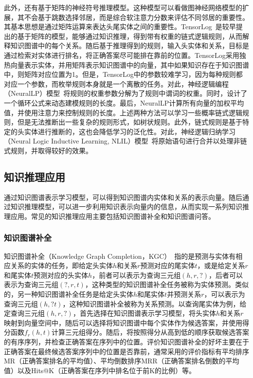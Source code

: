 \documentclass[algorithmlist, AutoFakeBold, AutoFakeSlant, figurelist, tablelist, nomlist, engineering]{seuthesix}
\begin{document}
此外，还有基于矩阵的神经符号推理模型。这种模型可以看做图神经网络模型的扩展，其不会基于跳数选择邻居，而是综合软注意力分数来评估不同邻居的重要性。其基本思想是通过矩阵运算来表达头尾实体之间的重要性。TensorLog~\cite{cohen2016tensorlog}是较早提出的基于矩阵的模型，能够通过知识推理，得到带有权重的链式逻辑规则，从而解释知识图谱中的每个关系。随后基于推理得到的规则，输入头实体和关系，目标是通过检索对实体进行排名，将正确答案尽可能排在靠前的位置。TensorLog采用独热向量表示实体，并用矩阵表示知识图谱中的向量，其中如果知识存在于知识图谱中，则矩阵对应位置为1。但是，TensorLog中的参数较难学习，因为每种规则都对应一个参数，而枚举规则本身就是一个离散的任务。对此，神经逻辑编程（NeuralLP）模型~\cite{yang2017differentiable}将规则的权重参数分解为了规则中谓词的权重。同时，设计了一个循环公式来动态建模规则的长度。最后，NeuralLP计算所有向量的加权平均值，并使用注意力来控制规则的长度。上述两种方法可以学习一些概率链式逻辑规则，但是无法推断出一些复杂的规则形式，如树状规则。此外，链式规则是基于特定的头实体进行推断的，这也会降低学习的泛化性。对此，神经逻辑归纳学习（Neural Logic Inductive Learning, NLIL）模型~\cite{yang2019learn}将原始语句进行合并以处理非链式规则，并取得较好的效果。

\subsection{知识推理应用}
通过知识图谱表示学习模型，可以得到知识图谱内实体和关系的表示向量。随后通过知识推理模型，可以进一步利用知识表示向量内的信息，从而实现一系列知识推理应用。常见的知识推理应用主要包括知识图谱补全和知识图谱问答。

\subsubsection{知识图谱补全}
知识图谱补全（Knowledge Graph Completion，KGC）~\cite{vu2019capsule}指的是预测与实体有相应关系的实体的任务，即给定头实体$h$和关系$r$预测对应的尾实体$t$，或是给定关系$r$和尾实体$t$预测对应的头实体$h$，前者可以表示为查询三元组$\left(h, r, ?\right)$，后者可以表示为查询三元组$\left(?, r, t\right)$，这种类型的知识图谱补全任务被称为实体预测。类似的，另一种知识图谱补全任务是给定头实体$h$和尾实体$t$并预测关系$r$，可以表示为查询三元组$\left(h, ? t\right)$，这种知识图谱补全被称为关系预测。以查询尾实体为例，给定查询三元组$\left(h, r, ?\right)$，首先选择在知识图谱表示学习模型，将头实体$h$和关系$r$映射到向量空间中，随后可以选择将知识图谱中每个实体作为候选答案，并使用得分函数$f_r\left(h, t\right)$计算三元组得分。随后，将按照得分从高到低的顺序获取候选答案的有序序列，并检查正确答案在序列中的位置。评价知识图谱补全的好坏主要在于正确答案在最终候选答案序列中的位置是否靠前，通常采用的评价指标有平均排序MR（正确答案排名的平均值）、平均倒数排序MRR（正确答案排名倒数的平均值）以及Hits@K（正确答案在序列中排名位于前K的比例）等。
\end{document}
